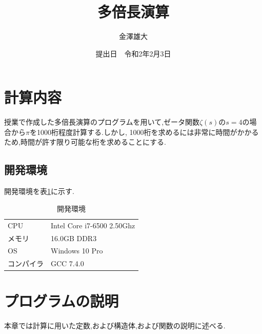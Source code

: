 \documentclass[a4j] {jarticle}
\title{多倍長演算}
\date{提出日　令和2年2月3日}
\author{金澤雄大}
\begin{document}
    \maketitle
    \thispagestyle{empty}
    \clearpage
    \addtocounter{page}{-1}

\section{計算内容}
    授業で作成した多倍長演算のプログラムを用いて,ゼータ関数$\zeta(s)$の$s=4$の場合から$\pi$を1000桁程度計算する.しかし,
    1000桁を求めるには非常に時間がかかるため,時間が許す限り可能な桁を求めることにする.

\subsection{開発環境}
開発環境を表\ref{kankyou}に示す.
\begin{table}[H]
  \caption{開発環境}
  \label{kankyou}
  \begin{center}
      \begin{tabular}{l|l}\hline
        CPU & Intel Core i7-6500 2.50Ghz\\
        メモリ & 16.0GB DDR3 \\
        OS & Windows 10 Pro \\
        コンパイラ & GCC 7.4.0 \\
        \hline
      \end{tabular}
  \end{center}
  \end{table}

\section{プログラムの説明}
本章では計算に用いた定数,および構造体,および関数の説明に述べる.
\end{document}
